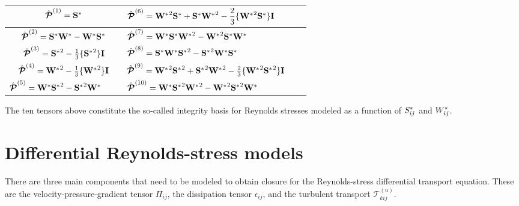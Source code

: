 \documentclass[oneside,a4paper,11pt]{report}
\begin{document}
\begin{center}
\begin{tabular} {| Sl | Sl | }
\hline
$\hat{\boldsymbol{\mathcal{P}}}^{(1)} = \mathbf{S^*}$ & $\hat{\boldsymbol{\mathcal{P}}}^{(6)} = \mathbf{W^*}^2 \mathbf{S^*} + \mathbf{S^*} \mathbf{W^*}^2 - \dfrac{2}{3} \{ \mathbf{W^*}^2 \mathbf{S^*} \} \mathbf{I}$ \\
\hline
$\hat{\boldsymbol{\mathcal{P}}}^{(2)} = \mathbf{S^*} \mathbf{W^*} - \mathbf{W^*} \mathbf{S^*}$ & $\hat{\boldsymbol{\mathcal{P}}}^{(7)} = \mathbf{W^*} \mathbf{S^*} \mathbf{W^*}^2 - \mathbf{W^*}^2 \mathbf{S^*} \mathbf{W^*}$ \\
\hline
$\hat{\boldsymbol{\mathcal{P}}}^{(3)} = \mathbf{S^*}^2 - \frac{1}{3} \{\mathbf{S^*}^2 \} \mathbf{I}  $ & $ \hat{\boldsymbol{\mathcal{P}}}^{(8)} = \mathbf{S^*} \mathbf{W^*} \mathbf{S^*}^2 - \mathbf{S^*}^2 \mathbf{W^*} \mathbf{S^*} $ \\
\hline
$ \hat{\boldsymbol{\mathcal{P}}}^{(4)} = \mathbf{W^*}^2 - \frac{1}{3} \{\mathbf{W^*}^2 \} \mathbf{I} $ & $ \hat{\boldsymbol{\mathcal{P}}}^{(9)} = \mathbf{W^*}^2 \mathbf{S^*}^2 + \mathbf{S^*}^2 \mathbf{W^*}^2 - \frac{2}{3} \{ \mathbf{W^*}^2 \mathbf{S^*}^2 \} \mathbf{I} $ \\
\hline
$ \hat{\boldsymbol{\mathcal{P}}}^{(5)} = \mathbf{W^*} \mathbf{S^*}^2 - \mathbf{S^*}^2 \mathbf{W^*} \qquad$ & $ \hat{\boldsymbol{\mathcal{P}}}^{(10)} = \mathbf{W^*} \mathbf{S^*}^2 \mathbf{W^*}^2 - \mathbf{W^*}^2 \mathbf{S^*}^2 \mathbf{W^*}$ \\
\hline
\end{tabular}
\end{center}

The ten tensors above constitute the so-called integrity basis for Reynolds stresses modeled as a function of $S^*_{ij}$ and $W^*_{ij}$.

\section{Differential Reynolds-stress models}

There are three main components that need to be modeled to obtain closure for the Reynolds-stress differential transport equation. These are the velocity-pressure-gradient tensor $\Pi_{ij}$, the dissipation tensor $\epsilon_{ij}$, and the turbulent transport $\mathcal{T}^{(u)}_{kij}$.
\end{document}
